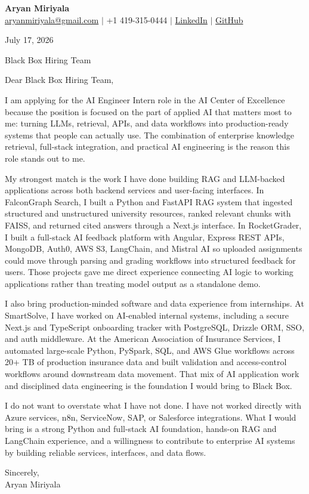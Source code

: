 \documentclass[letterpaper,11pt]{article}
\begin{document}
{\Large\textbf{Aryan Miriyala}}\\
\href{mailto:aryanmiriyala@gmail.com}{aryanmiriyala@gmail.com} $|$ +1 419-315-0444 $|$
\href{https://www.linkedin.com/in/aryan-miriyala-7788a21b6/}{LinkedIn} $|$
\href{https://github.com/aryanmiriyala}{GitHub}

July 17, 2026

Black Box Hiring Team

Dear Black Box Hiring Team,

I am applying for the AI Engineer Intern role in the AI Center of Excellence because the position is focused on the part of applied AI that matters most to me: turning LLMs, retrieval, APIs, and data workflows into production-ready systems that people can actually use. The combination of enterprise knowledge retrieval, full-stack integration, and practical AI engineering is the reason this role stands out to me.

My strongest match is the work I have done building RAG and LLM-backed applications across both backend services and user-facing interfaces. In FalconGraph Search, I built a Python and FastAPI RAG system that ingested structured and unstructured university resources, ranked relevant chunks with FAISS, and returned cited answers through a Next.js interface. In RocketGrader, I built a full-stack AI feedback platform with Angular, Express REST APIs, MongoDB, Auth0, AWS S3, LangChain, and Mistral AI so uploaded assignments could move through parsing and grading workflows into structured feedback for users. Those projects gave me direct experience connecting AI logic to working applications rather than treating model output as a standalone demo.

I also bring production-minded software and data experience from internships. At SmartSolve, I have worked on AI-enabled internal systems, including a secure Next.js and TypeScript onboarding tracker with PostgreSQL, Drizzle ORM, SSO, and auth middleware. At the American Association of Insurance Services, I automated large-scale Python, PySpark, SQL, and AWS Glue workflows across 20+ TB of production insurance data and built validation and access-control workflows around downstream data movement. That mix of AI application work and disciplined data engineering is the foundation I would bring to Black Box.

I do not want to overstate what I have not done. I have not worked directly with Azure services, n8n, ServiceNow, SAP, or Salesforce integrations. What I would bring is a strong Python and full-stack AI foundation, hands-on RAG and LangChain experience, and a willingness to contribute to enterprise AI systems by building reliable services, interfaces, and data flows.

Sincerely,\\
Aryan Miriyala
\end{document}
